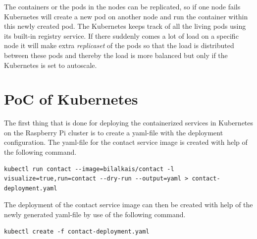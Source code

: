 The containers or the pods in the nodes can be replicated, so if one node fails Kubernetes will create a new pod on another node and run the container within this newly created pod. The Kubernetes keeps track of all the living pods using its built-in registry service.  
If there suddenly comes a lot of load on a specific node it will make extra \emph{replicaset} of the pods so that the load is distributed between these pods and thereby the load is more balanced but only if the Kubernetes is set to autoscale. 

\section{PoC of Kubernetes}




The first thing that is done for deploying the containerized services in Kubernetes on the Raspberry Pi cluster is to create a  yaml-file with the deployment configuration. The yaml-file for \eg the contact service image is created with help of the following command. 
\begin{lstlisting}[frame=single, ]
kubectl run contact --image=bilalkais/contact -l visualize=true,run=contact --dry-run --output=yaml > contact-deployment.yaml
\end{lstlisting}

The deployment of the contact service image can then be created with help of the newly generated yaml-file by use of the following command.
\begin{lstlisting}[frame=single, ]
kubectl create -f contact-deployment.yaml
\end{lstlisting}

